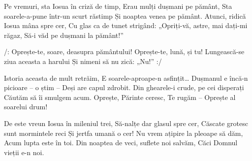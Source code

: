 \beginverse
Pe vremuri, sta Iosua în criză de timp,
Erau mulți dușmani pe pământ,
Sta soarele-a-pune într-un scurt răstimp
Și noaptea venea pe pământ.
Atunci, ridică Iosua mâna spre cer,
Cu glas ca de tunet strigând:
„Opriți-vă, astre, mai dați-mi răgaz,
Să-i văd pe dușmani la pământ!”
\endverse

\beginchorus
/: Oprește-te, soare, deasupra pământului!
Oprește-te, lună, și tu!
Lungească-se ziua aceasta a harului
Și nimeni să nu zică: „Nu!” :/
\endchorus

\beginverse
Istoria aceasta de mult retrăim,
E soarele-aproape-n asfințit…
Dușmanul e încă-n picioare – o știm –
Deși are capul zdrobit.
Din ghearele-i crude, pe cei disperați
Căutăm să îi smulgem acum.
Oprește, Părinte ceresc, Te rugăm –
Oprește al soarelui drum!
\endverse

\beginverse
De este vreun Iosua în mileniul trei,
Să-nalțe dar glasul spre cer,
Căscate grotesc sunt mormintele reci
Și jertfa umană o cer!
Nu vrem ațipire la pleoape să dăm,
Acum lupta este în toi.
Din noaptea de veci, suflete noi salvăm,
Căci Domnul vieții e-n noi.
\endverse
\endsong